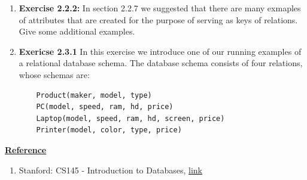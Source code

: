 \documentclass[12pt]{article}
\begin{document}
\begin{enumerate}[1.]
    \item \textbf{Exercise 2.2.2:} In section 2.2.7 we suggested that there are many
    exmaples of attributes that are created for the purpose of serving as keys of
    relations. Give some additional examples.


    \item \textbf{Exericse 2.3.1} In this exercise we introduce one of our running
    examples of a relational database schema. The database schema consists of four relations,
    whose schemas are:

    \bigskip

    \begin{lstlisting}
    Product(maker, model, type)
    PC(model, speed, ram, hd, price)
    Laptop(model, speed, ram, hd, screen, price)
    Printer(model, color, type, price)
    \end{lstlisting}
\end{enumerate}

\bigskip

\underline{\textbf{Reference}}

\bigskip

\begin{enumerate}[1)]
    \item Stanford: CS145 - Introduction to Databases, \href{http://infolab.stanford.edu/~ullman/fcdb/aut07/index.html}{link}
\end{enumerate}
\end{document}
